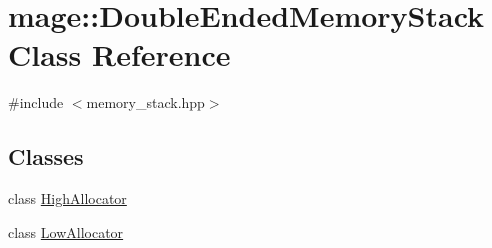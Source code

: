\hypertarget{classmage_1_1_double_ended_memory_stack}{}\section{mage\+:\+:Double\+Ended\+Memory\+Stack Class Reference}
\label{classmage_1_1_double_ended_memory_stack}


{\ttfamily \#include $<$memory\+\_\+stack.\+hpp$>$}

\subsection*{Classes}
\begin{DoxyCompactItemize}
\item 
class \hyperlink{classmage_1_1_double_ended_memory_stack_1_1_high_allocator}{High\+Allocator}
\item 
class \hyperlink{classmage_1_1_double_ended_memory_stack_1_1_low_allocator}{Low\+Allocator}
\end{DoxyCompactItemize}

